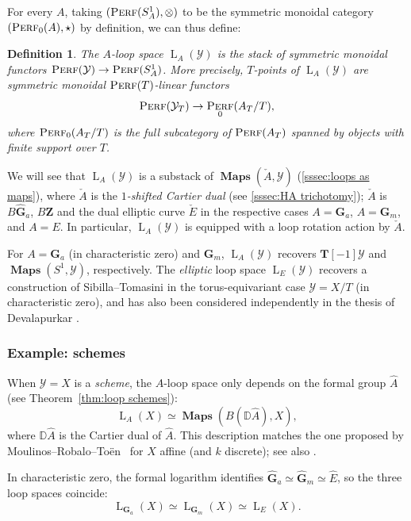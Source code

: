 \documentclass[12pt, oneside]{amsart}
\numberwithin{equation}{section}
\newtheorem{definition}[subsubsection]{Definition}
\theoremstyle{remark}
\theoremstyle{plain}
\DeclareMathOperator{\Perf}{\textsc{Perf}}
\DeclareMathOperator{\MAP}{\mathbf{Maps}}
\newcommand{\Loop}{\operatorname{L}}
\newcommand{\YY}{\mathcal{Y}}
\newcommand{\GGhat}{\widehat{\mathbf{G}}}
\newcommand{\GGa}{\mathbf{G}_{a}}
\newcommand{\GGm}{\mathbf{G}_{m}}
\newcommand{\bZ}{\mathbf{Z}}
\newcommand{\TT}{\mathbf{T}}
\begin{document}
For every $A$, taking $(\Perf(S^1_A), \otimes)$ to be the symmetric monoidal category $(\Perf_0(A), \star)$ by definition, we can thus define:

\begin{definition}
  The \emph{$A$-loop space} $\Loop_A(\YY)$ is the stack of symmetric monoidal functors $\Perf(\YY) \to \Perf(S^1_A)$.
  More precisely, $T$-points of $\Loop_A(\YY)$ are symmetric monoidal $\Perf(T)$-linear functors
  \[ \Perf(\YY_T) \to \Perf_0(A_T/T), \]
  where $\Perf_0(A_T/T)$ is the full subcategory of $\Perf(A_T)$ spanned by objects with finite support over $T$.
\end{definition}

We will see that $\Loop_A(\YY)$ is a substack of $\MAP(\check{A}, \YY)$ (\ref{sssec:loops as maps}), where $\check{A}$ is the \emph{$1$-shifted Cartier dual} (see \ref{sssec:HA trichotomy}); $\check{A}$ is $B\GGhat_a$, $B\bZ$ and the dual elliptic curve $\check{E}$ in the respective cases $A=\GGa$, $A=\GGm$, and $A=E$.
In particular, $\Loop_A(\YY)$ is equipped with a loop rotation action by $\check{A}$.

For $A=\GGa$ (in characteristic zero) and $\GGm$, $\Loop_A(\YY)$ recovers $\TT[-1]\YY$ and $\MAP(S^1, \YY)$, respectively.
The \emph{elliptic} loop space $\Loop_E(\YY)$ recovers a construction of Sibilla--Tomasini \cite{ST} in the torus-equivariant case $\YY=X/T$ (in characteristic zero), and has also been considered independently in the thesis of Devalapurkar \cite{Sanath}.

\subsubsection{Example: schemes}\label{sssec:intro/coh/HKR}

When $\YY=X$ is a \emph{scheme}, the $A$-loop space only depends on the formal group $\widehat{A}$ (see Theorem~\ref{thm:loop schemes}):
\begin{equation*}
  \Loop_A(X) \simeq \MAP(B(\mathbb{D}\widehat{A}), X),
\end{equation*}
where $\mathbb{D}\widehat{A}$ is the Cartier dual of $\widehat{A}$.
This description matches the one proposed by Moulinos--Robalo--To\"en~\cite[\S 6.3]{MRT} for $X$ affine (and $k$ discrete); see also \cite[Constr.~11.3]{LuriePrism}.

In characteristic zero, the formal logarithm identifies $\GGhat_a \simeq \GGhat_m \simeq \widehat{E}$, so the three loop spaces coincide:
\[ \Loop_{\GGa}(X) \simeq \Loop_{\GGm}(X) \simeq \Loop_E(X). \]
\end{document}
